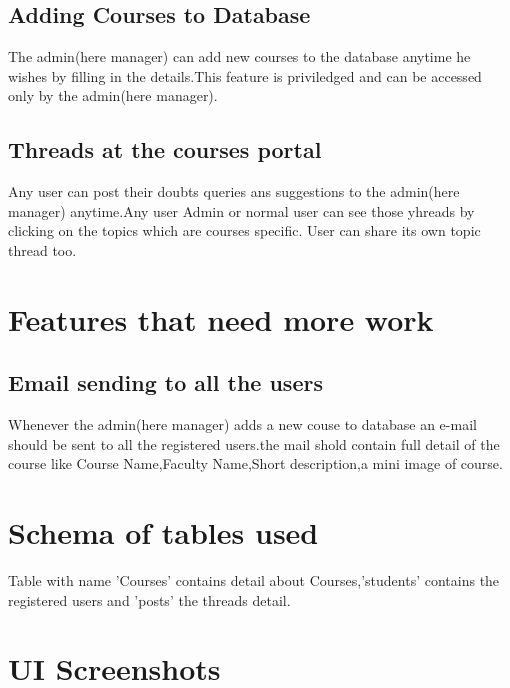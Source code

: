 \documentclass{article}
\begin{document}
\subsection{Adding Courses to Database}
\large{The admin(here manager) can add new courses to the database anytime he wishes by filling in the details.This feature is priviledged and can be accessed only by the admin(here manager).}

\subsection{Threads at the courses portal}
\large{Any user can post their doubts queries ans suggestions to the admin(here manager) anytime.Any user Admin or normal user can see those yhreads by clicking on the topics which are courses specific.
User can share its own topic thread too.}

\section{Features that need more work}
\subsection{Email sending to all the users}
\large{Whenever the admin(here manager) adds a new couse to database an e-mail should be sent to all the registered users.the mail shold contain full detail of the course like Course Name,Faculty Name,Short description,a mini image of course. }

\section{Schema of tables used}
\large{Table with name 'Courses' contains detail about Courses,'students' contains the registered users and 'posts' the  threads detail.}  

\newpage
\section{UI Screenshots}
\end{document}
